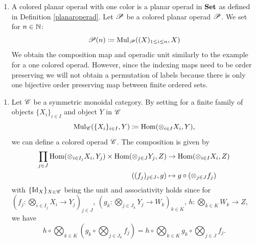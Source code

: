 \begin{egs}
\begin{enumerate}
        \item A colored planar operad with one color is a planar operad in
        $\Set$ as defined in Definition \ref{planaroperad}. Let $\P$ be a
        colored planar operad $\P$. We set for $n \in \N$:
        \[
         \P(n) \coloneqq \Mul_{\P}((X)_{1\leq i \leq n}, X)
        \]
        We obtain the composition map and operadic unit similarly to the example
        for a one colored operad. However, since the indexing maps need to be
        order preserving we will not obtain a permutation of labels because
        there is only one bijective order preserving map between finite ordered
        sets.
    \end{enumerate}
\end{egs}

\begin{egs}
    \begin{enumerate}
        \item Let $\C$ be a symmetric monoidal category. By setting for a finite
        family of objects $\{X_i\}_{i \in I}$ and object $Y$ in $\C$
        \[
            \Mul_{\C}(\{X_i\}_{i \in I}, Y) \coloneqq \Hom(\otimes_{i \in I} X_i, Y),
        \]
        we can define a colored operad $\C$. The composition is given by
        \begin{align*}
            \prod_{j \in J} \Hom(\otimes_{i \in I_j} X_i, Y_j) \times \Hom(\otimes_{j \in J} Y_j, Z) &\to \Hom(\otimes_{i \in I} X_i, Z) \\
            ((f_j)_{j \in J}, g) &\mapsto g \circ (\otimes_{j \in J} f_j) \\
        \end{align*}
        with $\{ \id_X\}_{X \in \C}$ being the unit and associativity holds
        since for $(f_j \colon \bigotimes_{i \in I_j} X_i \to Y_j)_{j \in J}$,
        $(g_k \colon \bigotimes_{j \in J_k} Y_j \to W_k)_{k \in K}$, $h \colon
        \bigotimes_{k \in K} W_k \to Z$, we have
        \[
            h \circ \bigotimes_{k \in K} \left(g_k \circ \bigotimes_{j \in J_k} f_j\right) = h \circ \bigotimes_{k \in K} g_k \circ \bigotimes_{j \in J} f_j.
        \]
    

\end{enumerate}
\end{egs}
